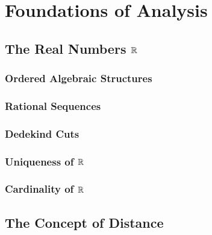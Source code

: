 \part{Foundations of Analysis}
\parttoc
\chapter{The Real Numbers $\mathbb{R}$}
\section{Ordered Algebraic Structures}
\section{Rational Sequences}
\section{Dedekind Cuts}
\section{Uniqueness of $\mathbb{R}$}
\section{Cardinality of $\mathbb{R}$}
\chapter{The Concept of Distance}
